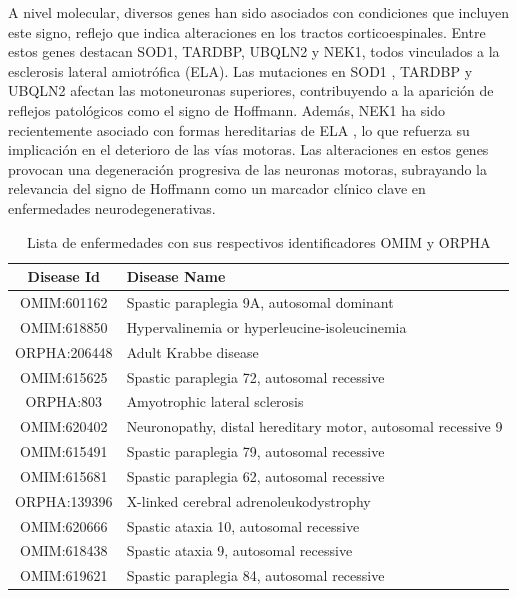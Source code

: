 A nivel molecular, diversos genes han sido asociados con condiciones que incluyen este signo, reflejo que indica alteraciones en los tractos corticoespinales. Entre estos genes destacan SOD1, TARDBP, UBQLN2 y NEK1, todos vinculados a la esclerosis lateral amiotrófica (ELA). Las mutaciones en SOD1 \cite{zhao2022g41d}, TARDBP \cite{sanchez2022atypical} y UBQLN2 \cite{teyssou:hal-03001781} afectan las motoneuronas superiores, contribuyendo a la aparición de reflejos patológicos como el signo de Hoffmann. Además, NEK1 ha sido recientemente asociado con formas hereditarias de ELA \cite{mann2023NEK1}, lo que refuerza su implicación en el deterioro de las vías motoras. Las alteraciones en estos genes provocan una degeneración progresiva de las neuronas motoras, subrayando la relevancia del signo de Hoffmann como un marcador clínico clave en enfermedades neurodegenerativas.

\begin{table}[h!]
	\centering
	\begin{tabular}{|c|l|}
		\hline
		\textbf{Disease Id}  & \textbf{Disease Name} \\ \hline
		OMIM:601162          & Spastic paraplegia 9A, autosomal dominant \\ \hline
		OMIM:618850          & Hypervalinemia or hyperleucine-isoleucinemia \\ \hline
		ORPHA:206448         & Adult Krabbe disease \\ \hline
		OMIM:615625          & Spastic paraplegia 72, autosomal recessive \\ \hline
		ORPHA:803            & Amyotrophic lateral sclerosis \\ \hline
		OMIM:620402          & Neuronopathy, distal hereditary motor, autosomal recessive 9 \\ \hline
		OMIM:615491          & Spastic paraplegia 79, autosomal recessive \\ \hline
		OMIM:615681          & Spastic paraplegia 62, autosomal recessive \\ \hline
		ORPHA:139396         & X-linked cerebral adrenoleukodystrophy \\ \hline
		OMIM:620666          & Spastic ataxia 10, autosomal recessive \\ \hline
		OMIM:618438          & Spastic ataxia 9, autosomal recessive \\ \hline
		OMIM:619621          & Spastic paraplegia 84, autosomal recessive \\ \hline
	\end{tabular}
	\caption{Lista de enfermedades con sus respectivos identificadores OMIM y ORPHA}
	\label{tab:disease_list}
\end{table}





